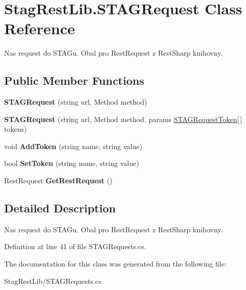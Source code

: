 \hypertarget{class_stag_rest_lib_1_1_s_t_a_g_request}{}\section{Stag\+Rest\+Lib.\+S\+T\+A\+G\+Request Class Reference}
\label{class_stag_rest_lib_1_1_s_t_a_g_request}


Nas request do S\+T\+A\+Gu. Obal pro Rest\+Request z Rest\+Sharp knihovny.  


\subsection*{Public Member Functions}
\begin{DoxyCompactItemize}
\item 
\mbox{\label{class_stag_rest_lib_1_1_s_t_a_g_request_a54df2b7a6e2d099cc3bca5c5708f22f2}} 
{\bfseries S\+T\+A\+G\+Request} (string url, Method method)
\item 
\mbox{\label{class_stag_rest_lib_1_1_s_t_a_g_request_a6d2dc0072cd8dab0ab0c1e161f6a7328}} 
{\bfseries S\+T\+A\+G\+Request} (string url, Method method, params \hyperlink{class_stag_rest_lib_1_1_s_t_a_g_request_token}{S\+T\+A\+G\+Request\+Token}\mbox{[}$\,$\mbox{]} tokens)
\item 
\mbox{\label{class_stag_rest_lib_1_1_s_t_a_g_request_a0951fd57c67b2dcc01e3c62dcbadccca}} 
void {\bfseries Add\+Token} (string name, string value)
\item 
\mbox{\label{class_stag_rest_lib_1_1_s_t_a_g_request_a9145534f75daba454a9af1cb2568cb00}} 
bool {\bfseries Set\+Token} (string name, string value)
\item 
\mbox{\label{class_stag_rest_lib_1_1_s_t_a_g_request_a0e7c30d3bd8ec41a2fa5f8149fed5411}} 
Rest\+Request {\bfseries Get\+Rest\+Request} ()
\end{DoxyCompactItemize}


\subsection{Detailed Description}
Nas request do S\+T\+A\+Gu. Obal pro Rest\+Request z Rest\+Sharp knihovny. 



Definition at line 41 of file S\+T\+A\+G\+Requests.\+cs.



The documentation for this class was generated from the following file\+:\begin{DoxyCompactItemize}
\item 
Stag\+Rest\+Lib/S\+T\+A\+G\+Requests.\+cs\end{DoxyCompactItemize}
